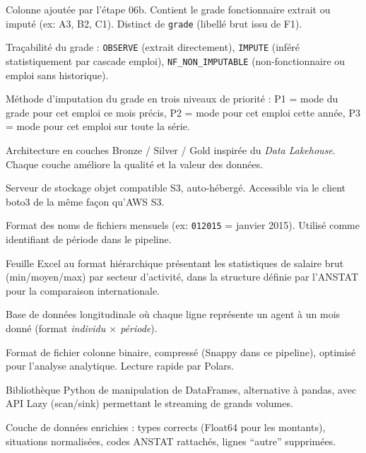 \documentclass[12pt,a4paper,french]{report}
\begin{document}
\begin{description}[leftmargin=3cm, labelwidth=2.8cm, style=nextline]
  \item[GRADE] Colonne ajoutée par l'étape 06b. Contient le grade fonctionnaire
  extrait ou imputé (ex: A3, B2, C1). Distinct de \texttt{grade} (libellé brut
  issu de F1).

  \item[GRADE\_SOURCE] Traçabilité du grade : \texttt{OBSERVE} (extrait
  directement), \texttt{IMPUTE} (inféré statistiquement par cascade emploi),
  \texttt{NF\_NON\_IMPUTABLE} (non-fonctionnaire ou emploi sans historique).

  \item[Imputation en cascade] Méthode d'imputation du grade en trois niveaux
  de priorité : P1 = mode du grade pour cet emploi ce mois précis,
  P2 = mode pour cet emploi cette année, P3 = mode pour cet emploi sur toute
  la série.

  \item[Medallion Architecture] Architecture en couches Bronze / Silver / Gold
  inspirée du \textit{Data Lakehouse}. Chaque couche améliore la qualité et la
  valeur des données.

  \item[MinIO] Serveur de stockage objet compatible S3, auto-hébergé.
  Accessible via le client boto3 de la même façon qu'AWS S3.

  \item[MMYYYY] Format des noms de fichiers mensuels (ex: \texttt{012015} =
  janvier 2015). Utilisé comme identifiant de période dans le pipeline.

  \item[MODELE\_ANSTAT] Feuille Excel au format hiérarchique présentant les
  statistiques de salaire brut (min/moyen/max) par secteur d'activité, dans
  la structure définie par l'ANSTAT pour la comparaison internationale.

  \item[Panel] Base de données longitudinale où chaque ligne représente un
  agent à un mois donné (format \textit{individu $\times$ période}).

  \item[Parquet] Format de fichier colonne binaire, compressé (Snappy dans ce
  pipeline), optimisé pour l'analyse analytique. Lecture rapide par Polars.

  \item[Polars] Bibliothèque Python de manipulation de DataFrames, alternative
  à pandas, avec API Lazy (scan/sink) permettant le streaming de grands
  volumes.

  \item[Silver] Couche de données enrichies : types corrects (Float64 pour les
  montants), situations normalisées, codes ANSTAT rattachés, lignes
  ``autre'' supprimées.


\end{description}
\end{document}

